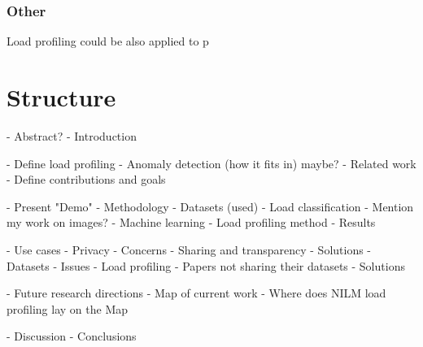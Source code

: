 \documentclass[
11pt, %
english, %
singlespacing, %
headsepline, %
]{MastersDoctoralThesis} %
\begin{document}
\subsubsection{Other}

Load profiling could be also applied to p



\section{Structure}

- Abstract?
- Introduction

- Define load profiling
- Anomaly detection (how it fits in) maybe?
- Related work
- Define contributions and goals

- Present "Demo"
- Methodology
	- Datasets (used)
	- Load classification
		- Mention my work on images?
		- Machine learning
	- Load profiling method
- Results

- Use cases
- Privacy
	- Concerns
	- Sharing and transparency
	- Solutions
- Datasets
	- Issues 
		- Load profiling
		- Papers not sharing their datasets
	- Solutions

- Future research directions
	- Map of current work
	- Where does NILM load profiling lay on the Map
	
- Discussion
- Conclusions






\end{document}

